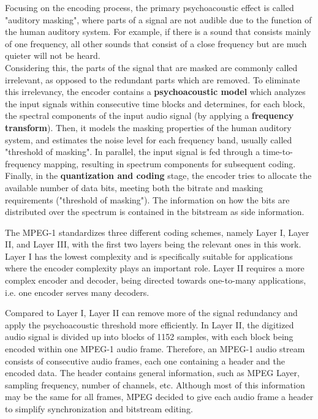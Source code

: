 Focusing on the encoding process, the primary psychoacoustic effect is called "auditory masking", where parts of a signal are not audible due to the function of the human auditory system. For example, if there is a sound that consists mainly of one frequency, all other sounds that consist of a close frequency but are much quieter will not be heard. \\
Considering this, the parts of the signal that are masked are commonly called irrelevant, as opposed to the redundant parts which are removed. %
To eliminate this irrelevancy, the encoder contains a \textbf{psychoacoustic model} which analyzes the input signals within consecutive time blocks and determines, for each block, the spectral components of the input audio signal (by applying a \textbf{frequency transform}). Then, it models the masking properties of the human auditory system, and estimates the noise level for each frequency band, usually called "threshold of masking". 
In parallel, the input signal is fed through a time-to-frequency mapping, resulting in spectrum components for subsequent coding. \\
Finally, in the \textbf{quantization and coding} stage, the encoder tries to allocate the available number of data bits, meeting both the bitrate and masking requirements ("threshold of masking"). The information on how the bits are distributed over the spectrum is contained in the bitstream as side information.

The MPEG-1 standardizes three different coding schemes, namely Layer I, Layer II, and Layer III, with the first two layers being the relevant ones in this work.
Layer I has the lowest complexity and is specifically suitable for applications where the encoder complexity plays an important role.
Layer II requires a more complex encoder and decoder, being directed towards one-to-many applications, i.e. one encoder serves many decoders. 

Compared to Layer I, Layer II can remove more of the signal redundancy and apply the psychoacoustic threshold more efficiently.
In Layer II, the digitized audio signal is divided up into blocks of 1152 samples, with each block being encoded within one MPEG-1 audio frame.
Therefore, an MPEG-1 audio stream consists of consecutive audio frames, each one containing a header and the encoded data. The header contains general information, such as MPEG Layer, sampling frequency, number of channels, etc. Although most of this information may be the same for all frames, MPEG decided to give each audio frame a header to simplify synchronization and bitstream editing.

